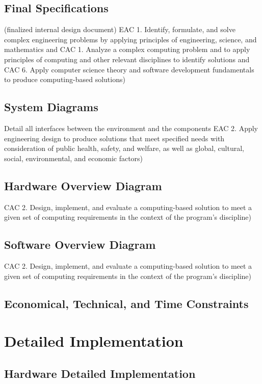 \documentclass{article}
\begin{document}
\subsection{Final Specifications}
(finalized internal design document) 
    EAC 1. Identify, formulate, and solve complex engineering problems by 
    applying principles of engineering, science, and mathematics and CAC 1. 
    Analyze a complex computing problem and to apply principles of computing 
    and other relevant disciplines to identify solutions and CAC 6. Apply 
    computer science theory and software development fundamentals to produce 
    computing-based solutions) 

\subsection{System Diagrams} 
Detail all interfaces between the environment and the components 
    EAC 2. Apply engineering design to produce solutions that meet specified 
    needs with consideration of public health, safety, and welfare, as well as 
    global, cultural, social, environmental, and economic factors) 

\subsection{Hardware Overview Diagram} 
CAC 2. Design, implement, and evaluate a 
    computing-based solution to meet a given set of computing requirements in 
    the context of the program’s discipline) 

\subsection{Software Overview Diagram} 
CAC 2. Design, implement, and evaluate a 
    computing-based solution to meet a given set of computing requirements in the 
    context of the program’s discipline) 

\subsection{Economical, Technical, and Time Constraints}  

\section{Detailed Implementation} 

\subsection{Hardware Detailed Implementation}
\end{document}
